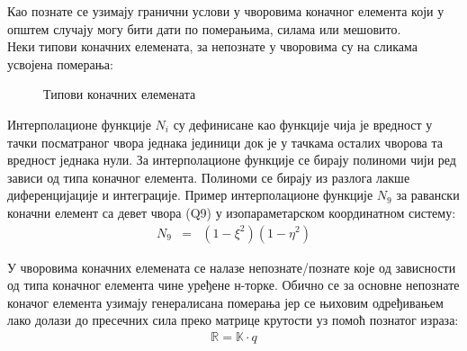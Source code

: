 \documentclass[11pt, a4paper]{article}
\begin{document}
Као познате се узимају гранични услови у чворовима коначног елемента који у општем случају могу бити дати по померањима, силама или мешовито.\\
Неки типови коначних елемената, за непознате у чворовима су на сликама усвојена померања:
\begin{figure}[H]
	 \hfill
	\hfill
	 \hfill
	 \hfill
	\caption{Типови коначних елемената \cite{mnd1}}
	\end{figure}
\par 
Интерполационе функције $N_i$ су дефинисане као функције чија је вредност у тачки посматраног чвора једнака јединици док је у тачкама осталих чворова та вредност једнака нули. За интерполационе функције се бирају полиноми чији ред зависи од типа коначног елемента. Полиноми се бирају из разлога лакше диференцијације и интеграције. Пример интерполационе функције $N_9$ за равански коначни елемент са девет чвора (Q9) у изопараметарском координатном систему:
\begin{eqnarray}
	N_9 &=& (1-\xi ^2)(1- \eta ^2)
\end{eqnarray}
\par
У чворовима коначних елемената се налазе непознате/познате које од зависности од типа коначног елемента чине уређене н-торке. Обично се за основне непознате коначог елемента узимају генералисана померања јер се њиховим одређивањем лако долази до пресечних сила преко матрице крутости уз помоћ познатог израза:
\begin{eqnarray}
	\mathbb{R} = \mathbb{K} \cdot q
\end{eqnarray}
\end{document}

